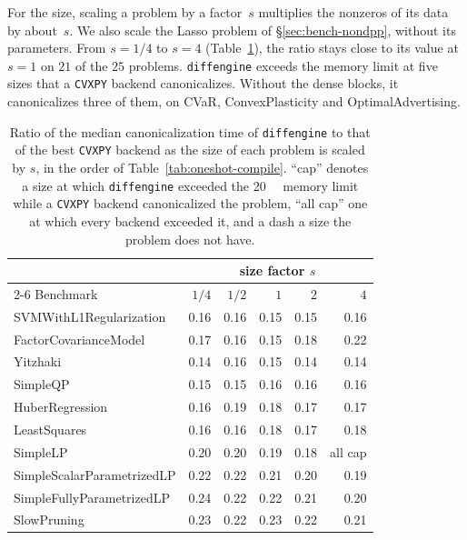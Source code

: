 For the size, scaling a problem by a factor~$s$ multiplies the nonzeros of its data by
about~$s$. We also scale the Lasso problem of \S\ref{sec:bench-nondpp}, without its parameters.
From $s = 1/4$ to $s = 4$ (Table~\ref{tab:size}), the ratio stays close to its value at $s = 1$
on $21$ of the $25$ problems. \texttt{diffengine} exceeds the memory limit at five sizes that a
\texttt{CVXPY} backend canonicalizes. Without the dense blocks, it canonicalizes three of them,
on CVaR, ConvexPlasticity and OptimalAdvertising.

\begin{table}[htbp]
\centering
\caption[Sensitivity to size]{Ratio of the median canonicalization time of \texttt{diffengine}
to that of the best \texttt{CVXPY} backend as the size of each problem is scaled by $s$, in the
order of Table~\ref{tab:oneshot-compile}. ``cap'' denotes a size at which \texttt{diffengine}
exceeded the \SI{20}{\giga\byte} memory limit while a \texttt{CVXPY} backend canonicalized the problem, ``all
cap'' one at which every backend exceeded it, and a dash a size the problem does not have.}
\label{tab:size}
{\footnotesize
\begin{tabular}{l rrrrr}
\toprule
& \multicolumn{5}{c}{size factor $s$} \\
\cmidrule(lr){2-6}
Benchmark & $1/4$ & $1/2$ & $1$ & $2$ & $4$ \\
\midrule
SVMWithL1Regularization     &    0.16 &    0.16 &    0.15 &    0.15 &    0.16 \\
FactorCovarianceModel       &    0.17 &    0.16 &    0.15 &    0.18 &    0.22 \\
Yitzhaki                    &    0.14 &    0.16 &    0.15 &    0.14 &    0.14 \\
SimpleQP                    &    0.15 &    0.15 &    0.16 &    0.16 &    0.16 \\
HuberRegression             &    0.16 &    0.19 &    0.18 &    0.17 &    0.17 \\
LeastSquares                &    0.16 &    0.16 &    0.18 &    0.17 &    0.18 \\
SimpleLP                    &    0.20 &    0.20 &    0.19 &    0.18 & all cap \\
SimpleScalarParametrizedLP  &    0.22 &    0.22 &    0.21 &    0.20 &    0.19 \\
SimpleFullyParametrizedLP   &    0.24 &    0.22 &    0.22 &    0.21 &    0.20 \\
SlowPruning                 &    0.23 &    0.22 &    0.23 &    0.22 &    0.21 \\

\end{tabular}}
\end{table}
